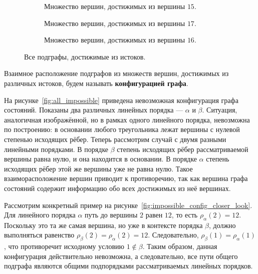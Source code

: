 \begin{figure}[htbp]
  \centering
  \begin{subfigure}{0.8\textwidth}
    \centering
    
    \caption{Множество вершин, достижимых из вершины $15$.}
    \label{fig:sg_subgraph_21}
  \end{subfigure}

  \vspace{5mm}

  \begin{subfigure}{0.45\textwidth}
    \centering
    
    \caption{Множество вершин, достижимых из вершины $17$.}
    \label{fig:sg_subgraph_23}
  \end{subfigure}
  \hfill
  \begin{subfigure}{0.45\textwidth}
    \centering
    
    \caption{Множество вершин, достижимых из вершины $16$.}
    \label{fig:sg_subgraph_22}
  \end{subfigure}
  \caption{Все подграфы, достижимые из истоков.}
  \label{fig:sg_subgraphs}
\end{figure}

\begin{definition}
  Взаимное расположение подграфов из множеств вершин, достижимых из
  различных истоков, будем называть \textbf{конфигурацией графа}.
\end{definition}

На рисунке~\ref{fig:all_impossible} приведена невозможная
конфигурация графа состояний. Показаны два различных линейных порядка
— $\alpha$ и $\beta$. Ситуация, аналогичная изображённой, но в рамках
одного линейного порядка, невозможна по построению: в основании
любого треугольника лежат вершины с нулевой степенью исходящих рёбер.
Теперь рассмотрим случай с двумя разными линейными порядками. В
порядке $\beta$ степень исходящих рёбер рассматриваемой вершины равна
нулю, и она находится в основании. В порядке $\alpha$ степень
исходящих рёбер этой же вершины уже не равна нулю. Такое
взаиморасположение вершин приводит к противоречию, так как вершина
графа состояний содержит информацию обо всех достижимых из неё вершинах.

Рассмотрим конкретный пример на
рисунке~\ref{fig:impossible_config_closer_look}. Для линейного
порядка $\alpha$ путь до вершины $2$ равен $12$, то есть
$\rho_{\alpha}(2) = 12$. Поскольку это та же самая вершина, но уже в
контексте порядка $\beta$, должно выполняться равенство
$\rho_{\beta}(2) = \rho_{\alpha}(2) = 12$. Следовательно,
$\rho_{\beta}(1) = \rho_{\alpha}(1)$, что противоречит исходному
условию $1 \not \in \beta$. Таким образом, данная конфигурация
действительно невозможна, а следовательно, все пути общего подграфа
являются общими подпорядками рассматриваемых линейных порядков.

